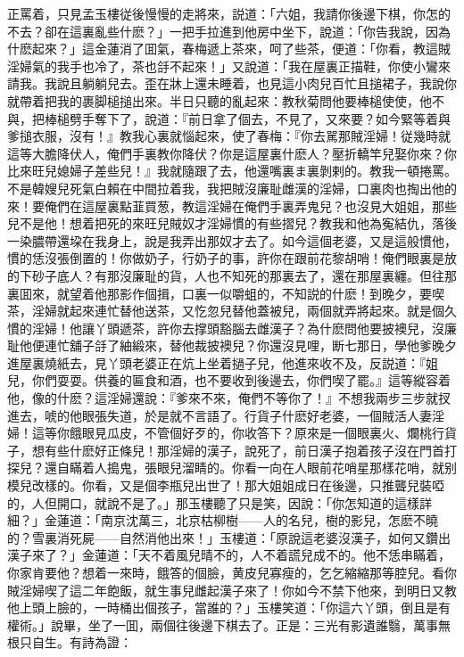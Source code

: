 正罵着，只見孟玉樓従後慢慢的走將來，説道：「六姐，我請你後邊下棋，你怎的不去？卻在這裏亂些什麽？」一把手拉進到他房中坐下，說道：「你告我說，因為什麽起來？」這金蓮消了囬氣，春梅遞上茶來，呵了些茶，便道：「你看，教這賊淫婦氣的我手也冷了，茶也㧱不起來！」又說道：「我在屋裏正描鞋，你使小鸞來請我。我說且躺躺兒去。歪在牀上還未睡着，也見這小肉兒百忙且搥裙子，我說你就帶着把我的裹脚槌搥出來。半日只聽的亂起來：教秋菊問他要棒槌使使，他不與，把棒槌劈手奪下了，說道：『前日拿了個去，不見了，又來要？如今緊等着與爹搥衣服，沒有！』教我心裏就惱起來，使了春梅：『你去駡那賊淫婦！従幾時就這等大膽降伏人，俺們手裏教你降伏？你是這屋裏什麽人？壓折轎竿兒娶你來？你比來旺兒媳婦子差些兒！』我就隨跟了去，他還嘴裏ま裏剝剌的。教我一頓捲罵。不是韓嫂兒死氣白賴在中間拉着我，我把賊沒廉耻雌漢的淫婦，口裏肉也掏出他的來！要俺們在這屋裏點韮買葱，教這淫婦在俺們手裏弄鬼兒？也沒見大姐姐，那些兒不是他！想着把死的來旺兒賊奴才淫婦慣的有些摺兒？教我和他為寃結仇，落後一染膿帶還垜在我身上，說是我弄出那奴才去了。如今這個老婆，又是這般慣他，慣的恁沒張倒置的！你做奶子，行奶子的事，許你在跟前花黎胡哨！俺們眼裏是放的下砂子底人？有那沒廉耻的貨，人也不知死的那裏去了，還在那屋裏纏。但往那裏囬來，就望着他那影作個揖，口裏一似嚼蛆的，不知説的什麽！到晚夕，要喫茶，淫婦就起來連忙替他送茶，又忔忽兒替他蓋被兒，兩個就弄將起來。就是個久慣的淫婦！他讓丫頭遞茶，許你去撑頭豁腦去雌漢子？為什麽問他要披襖兒，沒廉耻他便連忙舖子㧱了紬緞來，替他裁披襖兒？你還沒見哩，断七那日，學他爹晚夕進屋裏燒紙去，見丫頭老婆正在炕上坐着撾子兒，他進來收不及，反説道：『姐兒，你們耍耍。供養的匾食和酒，也不要收到後邊去，你們喫了罷。』這等縱容着他，像的什麽？這淫婦還說：『爹來不來，俺們不等你了！』不想我兩步三步就扠進去，唬的他眼張失道，於是就不言語了。行貨子什麽好老婆，一個賊活人妻淫婦！這等你餓眼見瓜皮，不管個好歹的，你收答下？原來是一個眼裏火、爛桃行貨子，想有些什麽好正條兒！那淫婦的漢子，說死了，前日漢子抱着孩子沒在門首打探兒？還自瞞着人搗鬼，張眼兒溜睛的。你看一向在人眼前花哨星那樣花哨，就别模兒改樣的。你看，又是個李瓶兒出世了！那大姐姐成日在後邊，只推聾兒裝啞的，人但開口，就說不是了。」那玉樓聽了只是笑，因說：「你怎知道的這樣詳細？」金蓮道：「南京沈萬三，北京枯柳樹——人的名兒，樹的影兒，怎麽不曉的？雪裏消死屍——自然消他出來！」玉樓道：「原說這老婆沒漢子，如何又鑽出漢子來了？」金蓮道：「天不着風兒晴不的，人不着謊兒成不的。他不恁串瞞着，你家肯要他？想着一來時，餓答的個臉，黄皮兒寡瘦的，乞乞縮縮那等腔兒。看你賊淫婦喫了這二年飽飯，就生事兒雌起漢子來了！你如今不禁下他來，到明日又教他上頭上臉的，一時桶出個孩子，當誰的？」玉樓笑道：「你這六丫頭，倒且是有權術。」說畢，坐了一囬，兩個往後邊下棋去了。正是：三光有影遺誰翳，萬事無根只自生。有詩為證：


